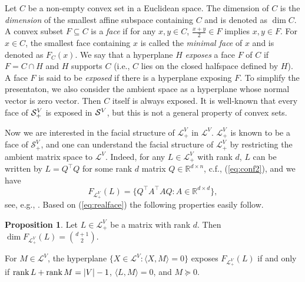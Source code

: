 \documentclass[11pt]{article}
\theoremstyle{definition}
\newtheorem{prop}[defi]{Proposition}
\begin{document}
Let  $C$ be a non-empty convex set in a Euclidean space.
 The dimension of $C$ is the {\em  dimension} of the smallest affine subspace containing $C$ and is denoted as $\dim C$.
 A convex subset $F \subseteq C$ is a {\em  face} if for any $x,y \in C$, $\frac{x+y}{2} \in F$ implies $x,y \in F$.
 For $x \in C$, the smallest face containing $x$ is called the  {\em minimal face} of $x$ and is denoted as $F_C(x)$.
 We say that a hyperplane $H$ {\em exposes} a face $F$ of $C$ if $F=C\cap H$ and $H$ supports $C$ (i.e., $C$ lies on the closed halfspace defined by $H$). A face $F$ is said to be {\em exposed} if there is a hyperplane exposing $F$. 
 To simplify the presentaton, we also consider the ambient space as a hyperplane whose normal vector is zero vector.
 Then $C$ itself is always exposed.
 It is well-known that every face of ${\cal S}_+^V$ is exposed in ${\cal S}^V$, 
 but this is not a general property of convex sets.

Now we are interested in the facial structure of $\mathcal{L}_+^V$ in $\mathcal{L}^V$. 
$\mathcal{L}_+^V$ is known to be a face of $\mathcal{S}_+^V$, and one can understand the facial structure of $\mathcal{L}_+^V$ by restricting the ambient matrix space to $\mathcal{L}^V$. 
Indeed, for any $L\in \mathcal{L}_+^V$ with rank $d$, $L$ can be  written by $L=Q^{\top} Q$ for some  rank $d$ matrix $Q\in \mathbb{R}^{d\times n}$, c.f., (\ref{eq:conf2}), and we have  
\begin{equation}\label{eq:realface}
F_{\mathcal{L}_+^V}(L)=\{Q^{\top}A^{\top}AQ: A\in \mathbb{R}^{d\times d}\},
\end{equation}
see, e.g., \cite{pataki2000geometry}. 
Based on (\ref{eq:realface}) the following properties easily follow.
\begin{prop}\label{prop:realface}
Let $L\in \mathcal{L}_+^V$ be a matrix with rank $d$.
Then $\dim F_{\mathcal{L}_+^V}(L)={d+1 \choose 2}$.

For $M\in \mathcal{L}^V$,  the hyperplane  $\{X\in \mathcal{L}^V: \langle X, M\rangle=0\}$ exposes $F_{\mathcal{L}_+^V}(L)$ if and only if 
$\rank L+\rank M=|V|-1$, $\langle L, M\rangle=0$, and $M\succeq 0$.
\end{prop}
\end{document}
